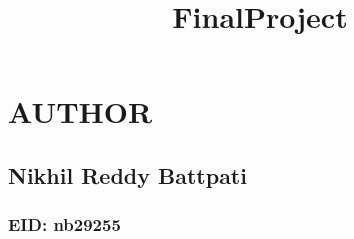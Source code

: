 \documentclass[11pt]{article}
\title{FinalProject}
\begin{document}
    
    \maketitle
    
    

    
    \section{AUTHOR}\label{author}

\subsection{Nikhil Reddy Battpati}\label{nikhil-reddy-battpati}

\subsubsection{EID: nb29255}\label{eid-nb29255}
\end{document}
